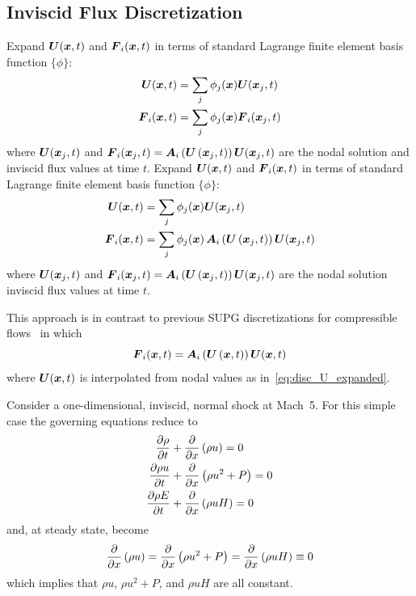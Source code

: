 \documentclass[compress,11pt]{beamer}
\begin{document}
\subsection{Inviscid Flux Discretization}
\frame
{
  \small
  {
    Expand ${\boldsymbol{U}}({\boldsymbol{x}},t)$ and ${\boldsymbol{F}}_i({\boldsymbol{x}},t)$ in terms of standard Lagrange finite element basis function
    $\{\phi\}$:
    \begin{align}
      {\boldsymbol{U}}  ({\boldsymbol{x}},t) &= \sum_j \phi_j({\boldsymbol{x}}) {\boldsymbol{U}}({\boldsymbol{x}}_j,t)   \label{eq:disc_U_expanded} \\
      {\boldsymbol{F}}_i({\boldsymbol{x}},t) &= \sum_j \phi_j({\boldsymbol{x}}) {\boldsymbol{F}}_i({\boldsymbol{x}}_j,t) \label{eq:disc_F_expanded}
    \end{align}
    where ${\boldsymbol{U}}({\boldsymbol{x}}_j,t)$ and ${\boldsymbol{F}}_i({\boldsymbol{x}}_j,t)={\boldsymbol{A}}_i\left({\boldsymbol{U}}\left({\boldsymbol{x}}_j,t\right)\right){\boldsymbol{U}}({\boldsymbol{x}}_j,t)$ are the nodal solution and inviscid flux values at time $t$.
  }
  {
    Expand ${\boldsymbol{U}}({\boldsymbol{x}},t)$ and ${\boldsymbol{F}}_i({\boldsymbol{x}},t)$ in terms of standard Lagrange finite element basis function
    $\{\phi\}$:
    \begin{align}
      {\boldsymbol{U}}  ({\boldsymbol{x}},t) &= \sum_j \phi_j({\boldsymbol{x}}) {\boldsymbol{U}}({\boldsymbol{x}}_j,t)   \label{eq:disc_U_expanded} \\
      {\boldsymbol{F}}_i({\boldsymbol{x}},t) &= \sum_j \phi_j({\boldsymbol{x}})\, {\boldsymbol{A}}_i\left({\boldsymbol{U}}\left({\boldsymbol{x}}_j,t\right)\right){\boldsymbol{U}}({\boldsymbol{x}}_j,t) \label{eq:disc_F=AU_expanded}
    \end{align}
    where ${\boldsymbol{U}}({\boldsymbol{x}}_j,t)$ and ${\boldsymbol{F}}_i({\boldsymbol{x}}_j,t)={\boldsymbol{A}}_i\left({\boldsymbol{U}}\left({\boldsymbol{x}}_j,t\right)\right){\boldsymbol{U}}({\boldsymbol{x}}_j,t)$ are the nodal solution inviscid flux values at time $t$.
  }
  
  {
    \vspace{1.5em}
    This approach is in contrast to previous SUPG discretizations for compressible flows~\cite{hauke_hughes_compressible_variables,gjlebeau_thesis,skaliabadi_dissertation} in which
    \begin{equation}
      {\boldsymbol{F}}_i({\boldsymbol{x}},t) = {\boldsymbol{A}}_i\left({\boldsymbol{U}}\left({\boldsymbol{x}},t\right)\right){\boldsymbol{U}}({\boldsymbol{x}},t) \label{eq:disc_F=AU_expanded_standard}
    \end{equation}
    where ${\boldsymbol{U}}({\boldsymbol{x}},t)$ is interpolated from nodal values as in~\eqref{eq:disc_U_expanded}.
  }
}


\frame
{
  \vspace{-1em}
  Consider a one-dimensional, inviscid, normal shock at Mach~5.  For this simple case the governing equations reduce to
  \begin{align*}
    {\frac{\partial{\rho}}{\partial{t}}} &+ {\frac{\partial{}}{\partial{x}}} \left(\rho u\right) = 0 \\
    {\frac{\partial{\rho u}}{\partial{t}}} &+ {\frac{\partial{}}{\partial{x}}}\left(\rho u^2 + P\right) = 0 \\
    {\frac{\partial{\rho E}}{\partial{t}}} &+ {\frac{\partial{}}{\partial{x}}} \left(\rho u H\right) = 0
  \end{align*}
  and, at steady state, become
  \begin{equation}
    {\frac{\partial{}}{\partial{x}}} \left(\rho u\right) = {\frac{\partial{}}{\partial{x}}} \left(\rho u^2 + P\right) = {\frac{\partial{}}{\partial{x}}} \left(\rho u H\right) \equiv 0 \label{eq:1d_steady_NS}
  \end{equation}
  which implies that $\rho u$, $\rho u^2+P$, and $\rho u H$ are all constant.
}
\end{document}
